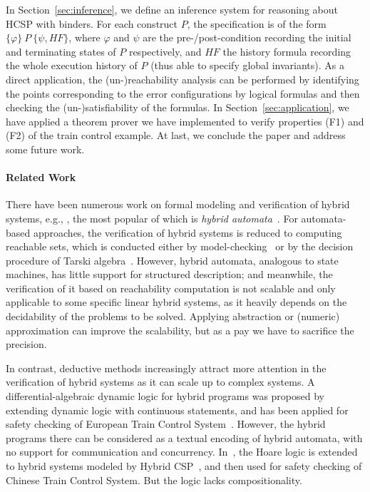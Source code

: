 \documentclass{llncs}
\newcommand{\inference}[3]{\{#1\} \ #2\ \{#3\}}
\newcommand{\Pre}{\varphi}
\newcommand{\Post}{\psi}
\newcommand{\HF}{HF}
\begin{document}
In Section~\ref{sec:inference}, we define an inference system for reasoning about HCSP with binders.
For each construct $P$, the specification is of the form $\inference{\Pre}{P}{\Post, \HF}$,
where $\Pre$ and $\Post$ are the pre-/post-condition recording the initial and terminating states of
$P$ respectively,  and $HF$ the history formula recording the whole
execution history of $P$ (thus able to specify global invariants).
As a direct application, the (un-)reachability analysis
can be performed
by identifying the points corresponding
to the error configurations by logical formulas and then checking the (un-)satisfiability of the formulas.
In  Section~\ref{sec:application}, we have applied a theorem prover we have implemented to verify properties (F1) and (F2) of the train control example.
At last, we conclude the paper and address some future work.

\paragraph{\textbf{Related Work} }

There have been numerous work on formal modeling and verification of hybrid systems, e.g., \cite{Alur:1992,Manna93,Henzinger96,LSVW96,LPY02}, the most popular of which is {\em hybrid automata}~\cite{Alur:1992,Manna93,Henzinger96}. For
 automata-based approaches, the verification of hybrid systems is reduced to computing reachable sets,
 which is conducted either by model-checking~\cite{Alur:1992} or by the decision procedure of Tarski algebra~\cite{LPY02}. However,
  hybrid automata, analogous to state machines, has
  little support for structured description; and meanwhile,
   the verification of it based on reachability computation is not scalable and
   only applicable to some specific linear hybrid systems,  as
   it heavily depends on the decidability of the problems to be solved.
Applying abstraction or (numeric) approximation \cite{EClarke03,ADI06,ABDM00}  can improve the scalability,
but as a pay we have to sacrifice the precision.



 In contrast, deductive methods increasingly attract more attention in the verification
   of hybrid systems as it can scale up to complex systems.
  A differential-algebraic dynamic logic for hybrid programs \cite{Platzer10} was proposed by extending
dynamic logic with continuous statements, and has been applied for safety checking of European Train Control
System~\cite{PQ09}. However, the hybrid programs there can be considered as a textual encoding of hybrid automata,
with no support for communication and concurrency.
In~\cite{LLQZ10,ZWZictac}, the Hoare logic is extended to hybrid systems
modeled by Hybrid CSP~\cite{Jifeng:1994,Zhou:1996}, and then used for safety checking of
Chinese Train Control System. But the logic lacks compositionality.
\end{document}
